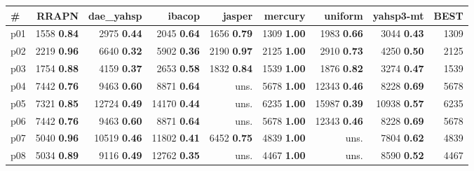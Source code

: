 \begin{tabular}{|l|rrrrrrr|r|}
\hline
\textbf{\#} & \textbf{RRAPN} & \textbf{dae\_yahsp} & \textbf{ibacop} & \textbf{jasper} & \textbf{mercury} & \textbf{uniform} & \textbf{yahsp3-mt} & \textbf{BEST}\\
\hline
p01 & {\footnotesize 1558} \textbf{0.84} & {\footnotesize 2975} \textbf{0.44} & {\footnotesize 2045} \textbf{0.64} & {\footnotesize 1656} \textbf{0.79} & {\footnotesize 1309} \textbf{1.00} & {\footnotesize 1983} \textbf{0.66} & {\footnotesize 3044} \textbf{0.43} & 1309\\
p02 & {\footnotesize 2219} \textbf{0.96} & {\footnotesize 6640} \textbf{0.32} & {\footnotesize 5902} \textbf{0.36} & {\footnotesize 2190} \textbf{0.97} & {\footnotesize 2125} \textbf{1.00} & {\footnotesize 2910} \textbf{0.73} & {\footnotesize 4250} \textbf{0.50} & 2125\\
p03 & {\footnotesize 1754} \textbf{0.88} & {\footnotesize 4159} \textbf{0.37} & {\footnotesize 2653} \textbf{0.58} & {\footnotesize 1832} \textbf{0.84} & {\footnotesize 1539} \textbf{1.00} & {\footnotesize 1876} \textbf{0.82} & {\footnotesize 3274} \textbf{0.47} & 1539\\
p04 & {\footnotesize 7442} \textbf{0.76} & {\footnotesize 9463} \textbf{0.60} & {\footnotesize 8871} \textbf{0.64} & uns. & {\footnotesize 5678} \textbf{1.00} & {\footnotesize 12343} \textbf{0.46} & {\footnotesize 8228} \textbf{0.69} & 5678\\
p05 & {\footnotesize 7321} \textbf{0.85} & {\footnotesize 12724} \textbf{0.49} & {\footnotesize 14170} \textbf{0.44} & uns. & {\footnotesize 6235} \textbf{1.00} & {\footnotesize 15987} \textbf{0.39} & {\footnotesize 10938} \textbf{0.57} & 6235\\
p06 & {\footnotesize 7442} \textbf{0.76} & {\footnotesize 9463} \textbf{0.60} & {\footnotesize 8871} \textbf{0.64} & uns. & {\footnotesize 5678} \textbf{1.00} & {\footnotesize 12343} \textbf{0.46} & {\footnotesize 8228} \textbf{0.69} & 5678\\
p07 & {\footnotesize 5040} \textbf{0.96} & {\footnotesize 10519} \textbf{0.46} & {\footnotesize 11802} \textbf{0.41} & {\footnotesize 6452} \textbf{0.75} & {\footnotesize 4839} \textbf{1.00} & uns. & {\footnotesize 7804} \textbf{0.62} & 4839\\
p08 & {\footnotesize 5034} \textbf{0.89} & {\footnotesize 9116} \textbf{0.49} & {\footnotesize 12762} \textbf{0.35} & uns. & {\footnotesize 4467} \textbf{1.00} & uns. & {\footnotesize 8590} \textbf{0.52} & 4467\\

\end{tabular}
